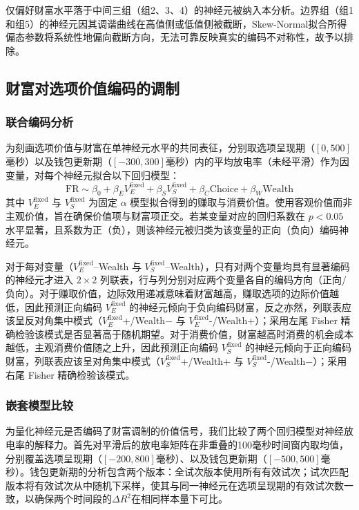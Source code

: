 仅偏好财富水平落于中间三组（组2、3、4）的神经元被纳入本分析。边界组（组1和组5）的神经元因其调谐曲线在高值侧或低值侧被截断，Skew-Normal拟合所得偏态参数将系统性地偏向截断方向，无法可靠反映真实的编码不对称性，故予以排除。

\subsection{财富对选项价值编码的调制}\label{chap2:methods_neural_offer}
\subsubsection{联合编码分析}\label{chap2:methods_neural_offer_joint}
为刻画选项价值与财富在单神经元水平的共同表征，分别取选项呈现期（$[0,500]$毫秒）以及钱包更新期（$[-300,300]$毫秒）内的平均放电率（未经平滑）作为因变量，对每个神经元拟合以下回归模型：
\begin{equation}
    \mathrm{FR} \sim \beta_0 + \beta_E V_E^{\mathrm{fixed}} + \beta_S V_S^{\mathrm{fixed}} + \beta_C \mathrm{Choice} + \beta_W \mathrm{Wealth}
\end{equation}
其中 $V_E^{\mathrm{fixed}}$ 与 $V_S^{\mathrm{fixed}}$ 为固定 $\alpha$ 模型拟合得到的赚取与消费价值。使用客观价值而非主观价值，旨在确保价值项与财富项正交。若某变量对应的回归系数在 $p < 0.05$ 水平显著，且系数为正（负），则该神经元被归类为该变量的正向（负向）编码神经元。

对于每对变量（$V_E^{\mathrm{fixed}}$–Wealth 与 $V_S^{\mathrm{fixed}}$–Wealth），只有对两个变量均具有显著编码的神经元才进入 $2 \times 2$ 列联表，行与列分别对应两个变量各自的编码方向（正向/负向）。对于赚取价值，边际效用递减意味着财富越高，赚取选项的边际价值越低，因此预测正向编码 $V_E^{\mathrm{fixed}}$ 的神经元倾向于负向编码财富，反之亦然，列联表应该呈反对角集中模式（$V_E^{\mathrm{fixed}}$+/Wealth$-$ 与 $V_E^{\mathrm{fixed}}$-/Wealth$+$）；采用左尾 Fisher 精确检验该模式是否显著高于随机期望。对于消费价值，财富越高时消费的机会成本越低，主观消费价值随之上升，因此预测正向编码 $V_S^{\mathrm{fixed}}$ 的神经元倾向于正向编码财富，列联表应该呈对角集中模式（$V_S^{\mathrm{fixed}}$+/Wealth$+$ 与 $V_S^{\mathrm{fixed}}$-/Wealth$-$）；采用右尾 Fisher 精确检验该模式。

\subsubsection{嵌套模型比较}\label{chap2:methods_neural_offer_time}

为量化神经元是否编码了财富调制的价值信号，我们比较了两个回归模型对神经放电率的解释力。首先对平滑后的放电率矩阵在非重叠的100毫秒时间窗内取均值，分别覆盖选项呈现期（$[-200,800]$毫秒）、以及钱包更新期（$[-500,500]$毫秒）。钱包更新期的分析包含两个版本：全试次版本使用所有有效试次；试次匹配版本将有效试次从中随机下采样，使其与同一神经元在选项呈现期的有效试次数一致，以确保两个时间段的$\Delta R^2$在相同样本量下可比。

